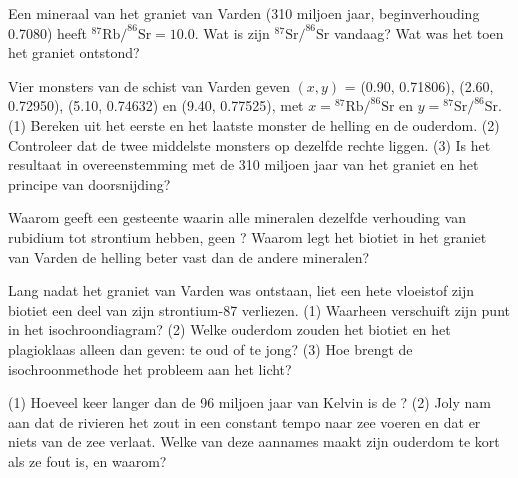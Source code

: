 \begin{exercise}[$\star\star$]\label{exo:g12:age-of-the-earth:6}
Een mineraal van het graniet van Varden (310 miljoen jaar, beginverhouding 0.7080)
heeft $^{87}\mathrm{Rb}/^{86}\mathrm{Sr} = 10.0$. Wat is zijn
$^{87}\mathrm{Sr}/^{86}\mathrm{Sr}$ vandaag? Wat was het toen het graniet
ontstond?
\end{exercise}

\begin{exercise}[$\star\star$]\label{exo:g12:age-of-the-earth:7}
Vier monsters van de schist van Varden geven $(x, y)$ = (0.90, 0.71806),
(2.60, 0.72950), (5.10, 0.74632) en (9.40, 0.77525), met $x =
{}^{87}\mathrm{Rb}/^{86}\mathrm{Sr}$ en $y = {}^{87}\mathrm{Sr}/^{86}\mathrm{Sr}$.
(1) Bereken uit het eerste en het laatste monster de helling en de ouderdom.
(2) Controleer dat de twee middelste monsters op dezelfde rechte liggen. (3) Is het
resultaat in overeenstemming met de 310 miljoen jaar van het graniet en het principe
van doorsnijding?
\end{exercise}

\begin{exercise}[$\star\star$]\label{exo:g12:age-of-the-earth:8}
Waarom geeft een gesteente waarin alle mineralen dezelfde verhouding van rubidium tot
strontium hebben, geen ? Waarom legt het biotiet in het graniet van Varden
de helling beter vast dan de andere mineralen?
\end{exercise}

\begin{exercise}[$\star\star$]\label{exo:g12:age-of-the-earth:9}
Lang nadat het graniet van Varden was ontstaan, liet een hete vloeistof zijn biotiet een deel
van zijn strontium-87 verliezen. (1) Waarheen verschuift zijn punt in het isochroondiagram?
(2) Welke ouderdom zouden het biotiet en het plagioklaas alleen dan geven: te oud of
te jong? (3) Hoe brengt de isochroonmethode het probleem aan het licht?
\end{exercise}

\begin{exercise}[$\star\star$]\label{exo:g12:age-of-the-earth:10}
(1) Hoeveel keer langer dan de 96 miljoen jaar van Kelvin is de ? (2) Joly nam aan dat de rivieren het zout in een constant tempo naar zee
voeren en dat er niets van de zee verlaat. Welke van deze aannames maakt zijn
ouderdom te kort als ze fout is, en waarom?
\end{exercise}

